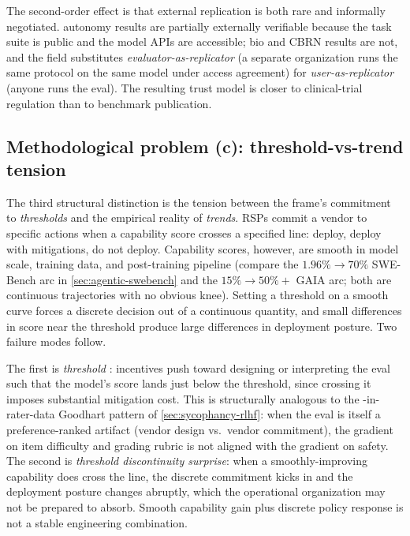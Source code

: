 The second-order effect is that external replication is both rare
and informally negotiated.  autonomy results
\citep{metr-autonomy-2024} are partially externally verifiable
because the task suite is public and the model APIs are accessible;
bio and CBRN results are not, and the field substitutes
\emph{evaluator-as-replicator} (a separate organization runs the
same protocol on the same model under access agreement) for
\emph{user-as-replicator} (anyone runs the eval). The resulting
trust model is closer to clinical-trial regulation than to
benchmark publication.

\subsection{Methodological problem (c): threshold-vs-trend tension}
\label{sec:dangerous-capability-threshold}

The third structural distinction is the tension between the 
frame's commitment to \emph{thresholds} and the empirical reality of
\emph{trends}. RSPs commit a vendor to specific actions when a
capability score crosses a specified line: deploy, deploy with
mitigations, do not deploy. Capability scores, however, are smooth in
model scale, training data, and post-training pipeline (compare the
$1.96\% \to 70\%$ SWE-Bench arc in \cref{sec:agentic-swebench} and
the $15\% \to 50\%+$ GAIA arc; both are continuous trajectories with
no obvious knee). Setting a threshold on a smooth curve forces a
discrete decision out of a continuous quantity, and small differences
in score near the threshold produce large differences in deployment
posture. Two failure modes follow.

The first is \emph{threshold }: incentives push toward
designing or interpreting the eval such that the model's score lands
just below the threshold, since crossing it imposes substantial
mitigation cost. This is structurally analogous to the
-in-rater-data Goodhart pattern of
\cref{sec:sycophancy-rlhf}: when the eval is itself a
preference-ranked artifact (vendor design vs.\ vendor commitment),
the gradient on item difficulty and grading rubric is not aligned
with the gradient on safety. The second is \emph{threshold
discontinuity surprise}: when a smoothly-improving capability does
cross the line, the discrete commitment kicks in and the deployment
posture changes abruptly, which the operational organization may not
be prepared to absorb. Smooth capability gain plus discrete policy
response is not a stable engineering combination.

